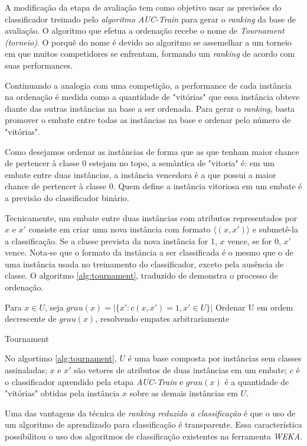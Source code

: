 A modificação da etapa de avaliação tem como objetivo usar as previsões do classificador treinado pelo \emph{algoritmo \emph{AUC-Train}} para gerar o \emph{ranking} da base de avaliação. O algoritmo que efetua a ordenação recebe o nome de \emph{Tournament (torneio)}. O porquê do nome é devido ao algoritmo se assemelhar a um torneio em que muitos competidores se enfrentam, formando um \emph{ranking} de acordo com suas performances.

Continuando a analogia com uma competição, a performance de cada instância na ordenação é medida como a quantidade de "vitórias" que essa instância obteve diante das outras instâncias na base a ser ordenada. Para gerar o \emph{ranking}, basta promover o embate entre todas as instâncias na base e ordenar pelo número de "vitórias".

Como desejamos ordenar as instâncias de forma que as que tenham maior chance de pertencer à classe $0$ estejam no topo, a semântica de "vitoria" é: em um embate entre duas instâncias, a instância vencedora é a que possui a maior chance de pertencer à classe $0$. Quem define a instância vitoriosa em um embate é a previsão do classificador binário.

Tecnicamente, um embate entre duas instâncias com atributos representados por $x$ e $x'$ consiste em criar uma nova instância com formato $\langle (x, x') \rangle$ e submetê-la a classificação. Se a classe prevista da nova instância for $1$, $x$ vence, se for $0$, $x'$ vence. Nota-se que o formato da instância a ser classificada é o mesmo que o de uma instância usada no treinamento do classificador, exceto pela ausência de classe. O algoritmo \ref{alg:tournament}, traduzido de \cite{langford08} demonstra o processo de ordenação.

\begin{algorithm}[h!]
    Para $x \in U$, seja $grau(x) = |\{x':c(x, x') = 1, x' \in U\}|$\;
    Ordenar U em ordem decrescente de $grau(x)$, resolvendo empates arbitrariamente
    
    \caption{Tournament}
    \label{alg:tournament}
\end{algorithm}

No algortimo \ref{alg:tournament}, $U$ é uma base composta por instâncias sem classes assinaladas; $x$ e $x'$ são vetores de atributos de duas instâncias em um embate; $c$ é o classificador aprendido pela etapa \emph{AUC-Train} e $grau(x)$ é a quantidade de "vitórias" obtidas pela instância $x$ sobre as demais instâncias em $U$.

Uma das vantagens da técnica de \emph{ranking reduzido a classificação} é que o uso de um algoritmo de aprendizado para classificação é transparente. Essa característica possibilitou o uso dos algoritmos de classificação existentes na ferramenta \emph{WEKA}.

